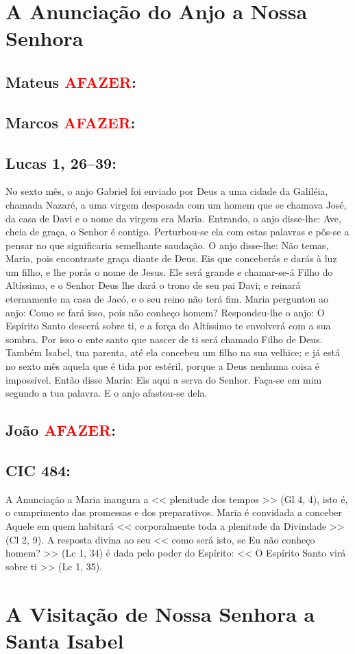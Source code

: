 \documentclass[10pt,a5paper]{book}
\newcommand{\from}[1]{\subsection*{#1}}
\newcommand{\TODO}{\textcolor{red}{\ttfamily AFAZER}}
\begin{document}

\section{A Anunciação do Anjo a Nossa Senhora}

\from{Mateus \TODO:}

\from{Marcos \TODO:}

\from{Lucas 1, 26--39:}

No sexto mês, o anjo Gabriel foi enviado por Deus a uma cidade da Galiléia, chamada Nazaré,
a uma virgem desposada com um homem que se chamava José, da casa de Davi e o nome da virgem era Maria.
Entrando, o anjo disse-lhe: Ave, cheia de graça, o Senhor é contigo.
Perturbou-se ela com estas palavras e pôs-se a pensar no que significaria semelhante saudação.
O anjo disse-lhe: Não temas, Maria, pois encontraste graça diante de Deus.
Eis que conceberás e darás à luz um filho, e lhe porás o nome de Jesus.
Ele será grande e chamar-se-á Filho do Altíssimo, e o Senhor Deus lhe dará o trono de seu pai Davi; e reinará eternamente na casa de Jacó,
e o seu reino não terá fim.
Maria perguntou ao anjo: Como se fará isso, pois não conheço homem?
Respondeu-lhe o anjo: O Espírito Santo descerá sobre ti, e a força do Altíssimo te envolverá com a sua sombra. Por isso o ente santo que nascer de ti será chamado Filho de Deus.
Também Isabel, tua parenta, até ela concebeu um filho na sua velhice; e já está no sexto mês aquela que é tida por estéril,
porque a Deus nenhuma coisa é impossível.
Então disse Maria: Eis aqui a serva do Senhor. Faça-se em mim segundo a tua palavra. E o anjo afastou-se dela.

\from{João \TODO:}

\from{CIC 484:}

A Anunciação a Maria inaugura a << plenitude dos tempos >> (Gl 4, 4), isto é, o cumprimento das promessas e dos preparativos.
Maria é convidada a conceber Aquele em quem habitará << corporalmente toda a plenitude da Divindade >> (Cl 2, 9).
A resposta divina ao seu << como será isto, se Eu não conheço homem? >> (Lc 1, 34) é dada pelo poder do Espírito:
<< O Espírito Santo virá sobre ti >> (Lc 1, 35).


\section{A Visitação de Nossa Senhora a Santa Isabel}
\end{document}
